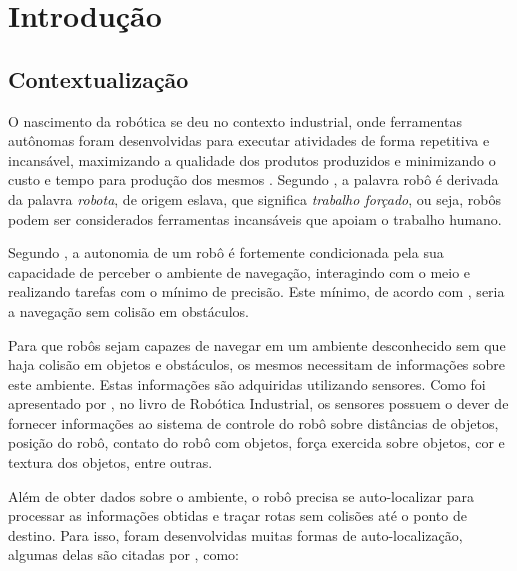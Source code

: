 \chapter*[Introdução]{Introdução}

\section{Contextualização}
	
	O nascimento da robótica se deu no contexto industrial, onde ferramentas autônomas foram desenvolvidas para executar atividades de forma repetitiva e incansável, maximizando a qualidade dos produtos produzidos e minimizando o custo e tempo para produção dos mesmos \cite{roboticaIndustrial}. Segundo \cite{roboticaIndustrial}, a palavra robô é derivada da palavra \textit{robota}, de origem eslava, que significa \textit{trabalho forçado}, ou seja, robôs podem ser considerados ferramentas incansáveis que apoiam o trabalho humano. 

	Segundo \cite{localizacaoEMapeamentoPaulo}, a autonomia de um robô é fortemente condicionada pela sua capacidade de perceber o ambiente de navegação, interagindo com o meio e realizando tarefas com o mínimo de precisão. Este mínimo, de acordo com \cite{localizacaoEMapeamentoPaulo}, seria a navegação sem colisão em obstáculos. 

	Para que robôs sejam capazes de navegar em um ambiente desconhecido sem que haja colisão em objetos e obstáculos, os mesmos necessitam de informações sobre este ambiente. Estas informações são adquiridas utilizando sensores. Como foi apresentado por \cite{interacaoRoboAmbiente}, no livro de Robótica Industrial, os sensores possuem o dever de fornecer informações ao sistema de controle do robô sobre distâncias de objetos, posição do robô, contato do robô com objetos, força exercida sobre objetos, cor e textura dos objetos, entre outras.

	Além de obter dados sobre o ambiente, o robô precisa se auto-localizar para processar as informações obtidas e traçar rotas sem colisões até o ponto de destino. Para isso, foram desenvolvidas muitas formas de auto-localização, algumas delas são citadas por \cite{roboBulldozerIV}, como:

